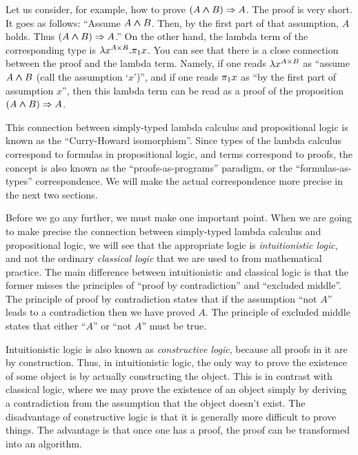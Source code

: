 \documentclass{article}
\begin{document}
Let us consider, for example, how to prove $(A\mathbin{\textrm{\rm\boldmath $\wedge$}} B)\Rightarrow A$. The
proof is very short. It goes as follows: ``Assume $A\mathbin{\textrm{\rm\boldmath $\wedge$}} B$. Then, by
the first part of that assumption, $A$ holds. Thus $(A\mathbin{\textrm{\rm\boldmath $\wedge$}} B)\Rightarrow
A$.'' On the other hand, the lambda term of the corresponding type is
$\lambda x^{A\times B}.\pi_1 x$. You can see that there is a close
connection between the proof and the lambda term. Namely, if one reads
$\lambda x^{A\times B}$ as ``assume $A\mathbin{\textrm{\rm\boldmath $\wedge$}} B$ (call the assumption
`$x$')'', and if one reads $\pi_1 x$ as ``by the first part of
assumption $x$'', then this lambda term can be read as a proof of 
the proposition $(A\mathbin{\textrm{\rm\boldmath $\wedge$}} B)\Rightarrow A$.

This connection between simply-typed lambda calculus and propositional
logic is known as the ``Curry-Howard isomorphism''. Since types of the
lambda calculus correspond to formulas in propositional logic, and
terms correspond to proofs, the concept is also known as the
``proofs-as-programs'' paradigm, or the ``formulas-as-types''
correspondence. We will make the actual correspondence more precise in
the next two sections.

Before we go any further, we must make one important point. When we
are going to make precise the connection between simply-typed lambda
calculus and propositional logic, we will see that the appropriate
logic is {\em intuitionistic logic}, and not the ordinary {\em
  classical logic} that we are used to from mathematical practice. The
main difference between intuitionistic and classical logic is that the
former misses the principles of ``proof by contradiction'' and
``excluded middle''. The principle of proof by contradiction states
that if the assumption ``not $A$'' leads to a contradiction then we
have proved $A$. The principle of excluded middle states that either
``$A$'' or ``not $A$'' must be true. 

Intuitionistic logic is also known as {\em constructive logic},
because all proofs in it are by construction. Thus, in intuitionistic
logic, the only way to prove the existence of some object is by
actually constructing the object. This is in contrast with classical
logic, where we may prove the existence of an object simply by
deriving a contradiction from the assumption that the object doesn't
exist. The disadvantage of constructive logic is that it is generally
more difficult to prove things. The advantage is that once one has a
proof, the proof can be transformed into an algorithm. 

\end{document}
